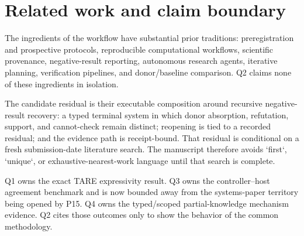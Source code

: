 \section{Related work and claim boundary}

The ingredients of the workflow have substantial prior traditions: preregistration and prospective protocols, reproducible computational workflows, scientific provenance, negative-result reporting, autonomous research agents, iterative planning, verification pipelines, and donor/baseline comparison. Q2 claims none of these ingredients in isolation.

The candidate residual is their executable composition around recursive negative-result recovery: a typed terminal system in which donor absorption, refutation, support, and cannot-check remain distinct; reopening is tied to a recorded residual; and the evidence path is receipt-bound. That residual is conditional on a fresh submission-date literature search. The manuscript therefore avoids `first`, `unique`, or exhaustive-nearest-work language until that search is complete.

Q1 owns the exact TARE expressivity result. Q3 owns the controller--host agreement benchmark and is now bounded away from the systems-paper territory being opened by P15. Q4 owns the typed/scoped partial-knowledge mechanism evidence. Q2 cites those outcomes only to show the behavior of the common methodology.